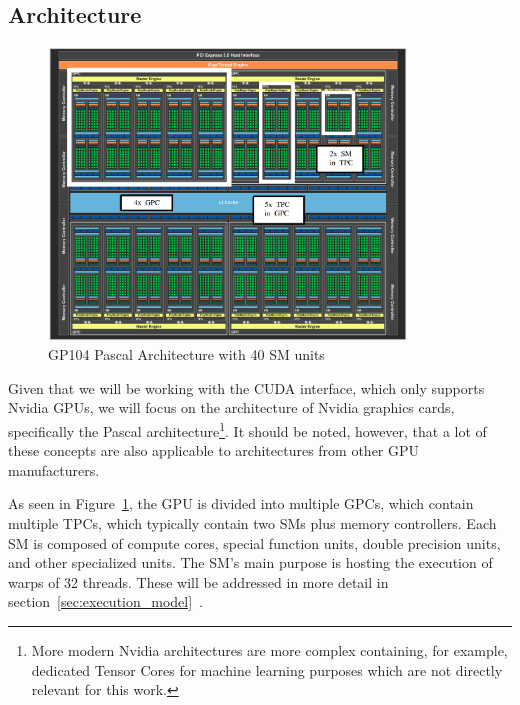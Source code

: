 \subsection{Architecture}

\begin{figure}[tbp]
  \centering
    \includegraphics[width=0.85\textwidth]{Chapters/Figures/Images/pascal_labeled.png}
    \caption{GP104 Pascal Architecture with 40 \gls{SM} units}
\label{fig:pascal}
\end{figure}


Given that we will be working with the \gls{CUDA} interface, which only supports Nvidia \gls{GPU}s, we will focus on the architecture of Nvidia graphics cards, specifically the Pascal architecture\footnote{More modern Nvidia architectures are more complex containing, for example, dedicated Tensor Cores for machine learning purposes which are not directly relevant for this work.}. It should be noted, however, that a lot of  these concepts are also applicable to architectures from other \gls{GPU} manufacturers.

As seen in Figure~\ref{fig:pascal}, the \gls{GPU} is divided into multiple \gls{GPC}s, which contain multiple \gls{TPC}s, which typically contain two \gls{SM}s plus memory controllers. Each \gls{SM} 
is composed of compute cores, special function units, double precision units, and other specialized units. The \gls{SM}'s main purpose is hosting the execution of warps of 32 threads. These will be addressed in more detail in section~\ref{sec:execution_model}~\cite{whitepaper:gtx1080, whitepaper:pascal}.

